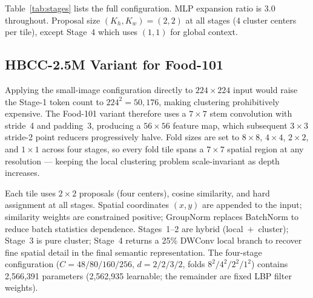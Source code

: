 \documentclass[conference]{IEEEtran}
\begin{document}
Table~\ref{tab:stages} lists the full configuration. MLP expansion
ratio is 3.0 throughout. Proposal size $(K_h,K_w){=}(2,2)$ at all
stages (4 cluster centers per tile), except Stage~4 which uses
$(1,1)$ for global context.

\begin{table}[h]
  \caption{Stage configuration for HBCC-Small (S) and HBCC-Medium
           (M). $d$: blocks per stage; $C$: embedding dimension;
           $\rho$: local ratio.}
  \label{tab:stages}
  \centering
  \renewcommand{\arraystretch}{1.15}
\end{table}

\subsection{HBCC-2.5M Variant for Food-101}
\label{ssec:food_arch}

Applying the small-image configuration directly to $224\!\times\!224$
input would raise the Stage-1 token count to $224^2{=}50{,}176$,
making clustering prohibitively expensive. The Food-101 variant
therefore uses a $7\!\times\!7$ stem convolution with stride~4 and
padding~3, producing a $56\!\times\!56$ feature map, which subsequent
$3\!\times\!3$ stride-2 point reducers progressively halve. Fold
sizes are set to $8\!\times\!8$, $4\!\times\!4$, $2\!\times\!2$, and
$1\!\times\!1$ across four stages, so every fold tile spans a
$7\!\times\!7$ spatial region at any resolution --- keeping the local
clustering problem scale-invariant as depth increases.

Each tile uses $2\!\times\!2$ proposals (four centers), cosine
similarity, and hard assignment at all stages. Spatial coordinates
$(x,y)$ are appended to the input; similarity weights are
constrained positive; GroupNorm replaces BatchNorm to reduce batch
statistics dependence. Stages~1--2 are hybrid (local~$+$~cluster);
Stage~3 is pure cluster; Stage~4 returns a 25\% DWConv local branch
to recover fine spatial detail in the final semantic representation.
The four-stage configuration
($C{=}48/80/160/256$, $d{=}2/2/3/2$, folds $8^2/4^2/2^2/1^2$)
contains 2{,}566{,}391 parameters (2{,}562{,}935 learnable; the
remainder are fixed LBP filter weights).
\end{document}
